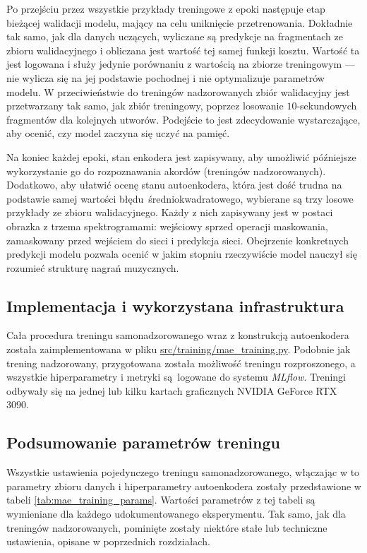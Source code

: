 Po przejściu przez wszystkie przykłady treningowe z epoki następuje etap bieżącej walidacji modelu, mający na celu uniknięcie przetrenowania. Dokładnie tak samo, jak dla danych uczących, wyliczane są predykcje na fragmentach ze zbioru walidacyjnego i obliczana jest wartość tej samej funkcji kosztu.  Wartość ta jest logowana i służy jedynie porównaniu z wartością na zbiorze treningowym --- nie wylicza się na jej podstawie pochodnej i nie optymalizuje parametrów modelu. W przeciwieństwie do treningów nadzorowanych zbiór walidacyjny jest przetwarzany tak samo, jak zbiór treningowy, poprzez losowanie $10$-sekundowych fragmentów dla kolejnych utworów. Podejście to jest zdecydowanie wystarczające, aby ocenić, czy model zaczyna się uczyć na pamięć.

Na koniec każdej epoki, stan enkodera jest zapisywany, aby umożliwić późniejsze wykorzystanie go do rozpoznawania akordów (treningów nadzorowanych). Dodatkowo, aby ułatwić ocenę stanu autoenkodera, która jest dość trudna na podstawie samej wartości błędu średniokwadratowego, wybierane są trzy losowe przykłady ze zbioru walidacyjnego. Każdy z nich zapisywany jest w postaci obrazka z trzema spektrogramami: wejściowy sprzed operacji maskowania, zamaskowany przed wejściem do sieci i predykcja sieci. Obejrzenie konkretnych predykcji modelu pozwala ocenić w jakim stopniu rzeczywiście model nauczył się rozumieć strukturę nagrań muzycznych.

\subsection{Implementacja i wykorzystana infrastruktura}

Cała procedura treningu samonadzorowanego wraz z konstrukcją autoenkodera została zaimplementowana w pliku \url{src/training/mae_training.py}. Podobnie jak trening nadzorowany, przygotowana została możliwość treningu rozproszonego, a wszystkie hiperparametry i metryki są logowane do systemu \emph{MLflow}. Treningi odbywały się na jednej lub kilku kartach graficznych NVIDIA GeForce RTX 3090.

\subsection{Podsumowanie parametrów treningu}

Wszystkie ustawienia pojedynczego treningu samonadzorowanego, włączając w to parametry zbioru danych i hiperparametry autoenkodera zostały przedstawione w tabeli \ref{tab:mae_training_params}.  Wartości parametrów z tej tabeli są wymieniane dla każdego udokumentowanego eksperymentu. Tak samo, jak dla treningów nadzorowanych, pominięte zostały niektóre stałe lub techniczne ustawienia, opisane w poprzednich rozdziałach. 

